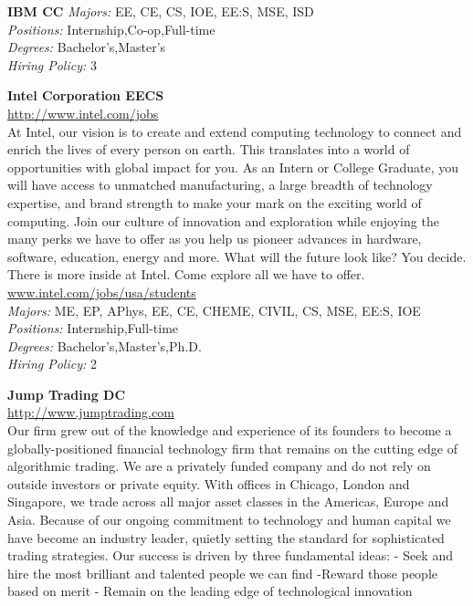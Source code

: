 \documentclass[twoside]{article}
\begin{document}
\begin{center}
\begin{multicols}{2}
\begin{minipage}{.95\columnwidth}{\Large\bf IBM \hfill CC}
    \emph{Majors:} EE, CE, CS, IOE, EE:S, MSE, ISD\\
    \emph{Positions:} Internship,Co-op,Full-time\\
    \emph{Degrees:} Bachelor's,Master's\\
    \emph{Hiring Policy:} 3\\
\end{minipage}
 \begin{minipage}{.95\columnwidth}{\Large\bf Intel Corporation \hfill EECS}\\
    \url{http://www.intel.com/jobs}\\
    At Intel, our vision is to create and extend computing technology to connect and enrich the lives of every person on earth. This translates into a world of opportunities with global impact for you. As an Intern or College Graduate, you will have access to unmatched manufacturing, a large breadth of technology expertise, and brand strength to make your mark on the exciting world of computing. Join our culture of innovation and exploration while enjoying the many perks we have to offer as you help us pioneer advances in hardware, software, education, energy and more. What will the future look like? You decide. There is more inside at Intel. Come explore all we have to offer. \url{www.intel.com/jobs/usa/students}\\
    \emph{Majors:} ME, EP, APhys, EE, CE, CHEME, CIVIL, CS, MSE, EE:S, IOE\\
    \emph{Positions:} Internship,Full-time\\
    \emph{Degrees:} Bachelor's,Master's,Ph.D.\\
    \emph{Hiring Policy:} 2\\
\end{minipage}
 \begin{minipage}{.95\columnwidth}{\Large\bf Jump Trading \hfill DC}\\
    \url{http://www.jumptrading.com}\\
    Our firm grew out of the knowledge and experience of its founders to become a globally-positioned financial technology firm that remains on the cutting edge of algorithmic trading. We are a privately funded company and do not rely on outside investors or private equity. With offices in Chicago, London and Singapore, we trade across all major asset classes in the Americas, Europe and Asia. Because of our ongoing commitment to technology and human capital we have become an industry leader, quietly setting the standard for sophisticated trading strategies. Our success is driven by three fundamental ideas: - Seek and hire the most brilliant and talented people we can find -Reward those people based on merit - Remain on the leading edge of technological innovation\\

\end{minipage}
\end{multicols}
\end{center}
\end{document}
